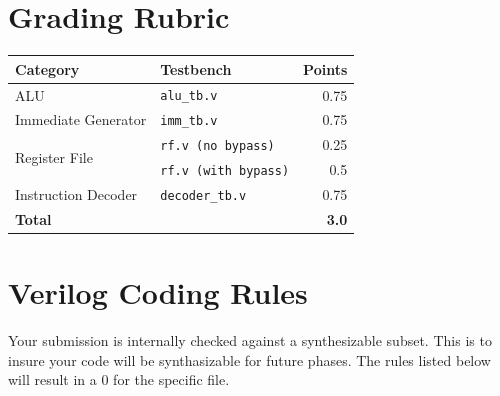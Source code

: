 \documentclass[11pt]{article}
\begin{document}
\section{Grading Rubric}
\label{sec:rubric}
\begin{center}
\begin{tabular}{@{}llr@{}}
\toprule
\textbf{Category} & \textbf{Testbench} & \textbf{Points} \\
\midrule
ALU                  & \texttt{alu\_tb.v}          & 0.75 \\
Immediate Generator  & \texttt{imm\_tb.v}          & 0.75 \\
\multirow[t]{2}{*}{Register File}
                     & \texttt{rf.v (no bypass)} & 0.25 \\
                     & \texttt{rf.v (with bypass)} & 0.5 \\
Instruction Decoder  & \texttt{decoder\_tb.v}      & 0.75 \\
\midrule
\textbf{Total} & & \textbf{3.0} \\
\bottomrule
\end{tabular}
\end{center}

\section{Verilog Coding Rules}
\label{sec:rules}
Your submission is internally checked against a synthesizable subset. This is to insure your code will be synthasizable for future phases. The rules listed below will result in a 0 for the specific file.
\end{document}
